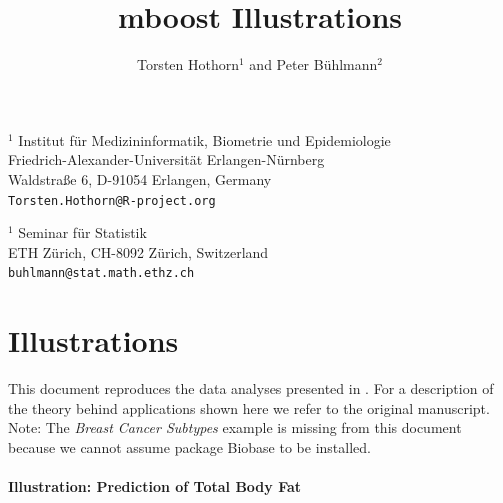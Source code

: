 \documentclass{article}
\newcommand{\Rpackage}[1]{{\normalfont\fontseries{b}\selectfont #1}}
\begin{document}

\title{\Rpackage{mboost} Illustrations}

\author{Torsten Hothorn$^1$ and Peter B\"uhlmann$^2$}

\date{}

\maketitle

\noindent$^1$ Institut f\"ur Medizininformatik, Biometrie und Epidemiologie\\
           Friedrich-Alexander-Universit\"at Erlangen-N\"urnberg\\
           Waldstra{\ss}e 6, D-91054 Erlangen, Germany \\
           \texttt{Torsten.Hothorn@R-project.org}
           \newline

\noindent$^1$ Seminar f{\"u}r Statistik \\ 
              ETH Z\"urich, CH-8092 Z{\"u}rich, Switzerland \\
              \texttt{buhlmann@stat.math.ethz.ch}
           \newline

\section{Illustrations}

This document reproduces the data analyses presented in
\cite{BuhlmannHothorn06}. For a description of the theory behind
applications shown here we refer to the original manuscript.
Note: The \textit{Breast Cancer Subtypes} example is missing from this
document because we cannot assume package \Rpackage{Biobase} to be
installed.

 

\paragraph{Illustration: Prediction of Total Body Fat}

\end{document}

